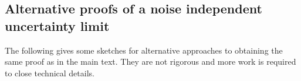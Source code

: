 \documentclass[reqno]{amsart}
\begin{document}
\subsection{Alternative proofs of a noise independent uncertainty limit}\label{App:Proofs}
The following gives some sketches for alternative approaches to obtaining the same proof as in the main text. They are not rigorous and more work is required to close technical details. 
\end{document}
